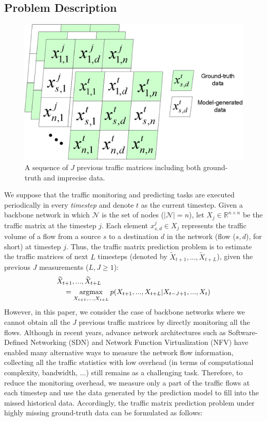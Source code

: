 \subsection{Problem Description}
\label{subsec:problem_description}
\begin{figure}
\centering
\includegraphics[width=0.6\columnwidth]{preliminaries_figs/traffic_matrices.eps}
		\caption{A sequence of $J$ previous traffic matrices including both ground-truth and imprecise data. \label{fig:traffic_matrices}}
\end{figure}
We suppose that the traffic monitoring and predicting tasks are executed periodically in every \textit{timestep} and denote $t$ as the current timestep. Given a backbone network in which $\mathcal{N}$ is the set of nodes ($\left |  \mathcal{N} \right |=n$), let $X_j \in \mathbb{R}^{n \times n}$ be the traffic matrix at the timestep $j$. Each element $x_{s,d}^j \in X_j$  represents the traffic volume of a flow from a source $s$ to a destination $d$ in the network (flow ($s,d$), for short) at timestep $j$. Thus, the traffic matrix prediction problem is to estimate the traffic matrices of next $L$ timesteps (denoted by $\widetilde{X}_{t+1},...,\widetilde{X}_{t+L}$), given the previous $J$ measurements ($L,J \geq 1$):
\begin{equation}
\begin{aligned}
&\widetilde{X}_{t+1},...,\widetilde{X}_{t+L} \\
	&\quad = \operatorname*{argmax}_{X_{t+1},...,X_{t+L}} p(X_{t+1},...,X_{t+L} | X_{t-J+1},...,X_{t})
\end{aligned}
\end{equation}
However, in this paper, we consider the case of backbone networks where we cannot obtain all the $J$ previous traffic matrices by directly monitoring all the flows. Although in recent years, advance network architectures such as Software-Defined Networking (SDN) \cite{mckeown2008openflow} and Network Function Virtualization (NFV) have enabled many alternative ways to measure the network flow information, collecting all the traffic statistics with low overhead (in terms of computational complexity, bandwidth, ...) still remains as a challenging task. Therefore, to reduce the monitoring overhead, we measure only a part of the traffic flows at each timestep and use the data generated by the prediction model to fill into the missed historical data.
Accordingly, the traffic matrix prediction problem under highly missing ground-truth data can be formulated as follows:

